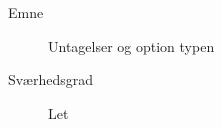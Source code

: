 \begin{description}
\item[Emne] Untagelser og option typen
\item[Sværhedsgrad] Let
\end{description}

